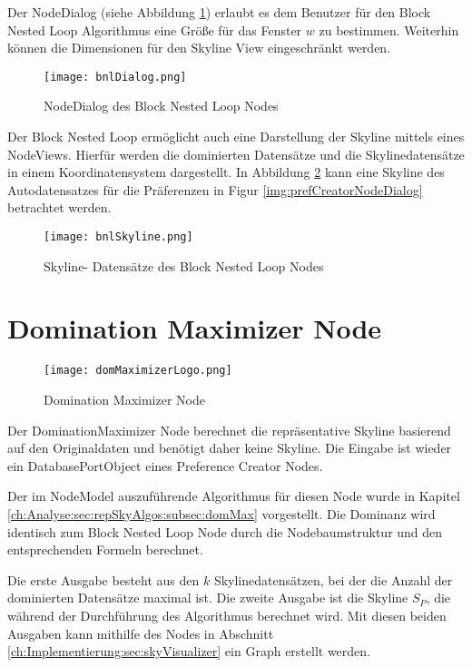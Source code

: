 Der NodeDialog (siehe Abbildung \ref{img:bnlNodeDialog}) erlaubt es dem Benutzer für den Block Nested Loop Algorithmus eine Größe für das Fenster $w$ zu bestimmen. Weiterhin können die Dimensionen für den Skyline View eingeschränkt werden.

\begin{figure}[H]
	\centering
	\texttt{[image: bnlDialog.png]}
	\caption{NodeDialog des Block Nested Loop Nodes}
	\label{img:bnlNodeDialog}
\end{figure}

Der Block Nested Loop ermöglicht auch eine Darstellung der Skyline mittels eines NodeViews. Hierfür werden die dominierten Datensätze und die Skylinedatensätze in einem Koordinatensystem dargestellt. In Abbildung \ref{img:bnlSkyline} kann eine Skyline des Autodatensatzes für die Präferenzen in Figur \ref{img:prefCreatorNodeDialog} betrachtet werden.

\begin{figure}[H]
	\centering
	\texttt{[image: bnlSkyline.png]}
	\caption{Skyline- Datensätze des Block Nested Loop Nodes}
	\label{img:bnlSkyline}
\end{figure}
\section{Domination Maximizer Node}
\label{ch:Implementierung:sec:dominationMaximizerNode}
\begin{figure}[H]
	\centering
	\texttt{[image: domMaximizerLogo.png]}
	\caption{Domination Maximizer Node}
	\label{img:domMaximierLogo}
\end{figure}

Der DominationMaximizer Node berechnet die repräsentative Skyline basierend auf den Originaldaten und benötigt daher keine Skyline. Die Eingabe ist wieder ein DatabasePortObject eines Preference Creator Nodes.

Der im NodeModel auszuführende Algorithmus für diesen Node wurde in Kapitel \ref{ch:Analyse:sec:repSkyAlgos:subsec:domMax} vorgestellt. Die Dominanz wird identisch zum Block Nested Loop Node durch die Nodebaumstruktur und den entsprechenden Formeln berechnet.

Die erste Ausgabe besteht aus den $k$ Skylinedatensätzen, bei der die Anzahl der dominierten Datensätze maximal ist. Die zweite Ausgabe ist die Skyline $S_P$, die während der Durchführung des Algorithmus berechnet wird. Mit diesen beiden Ausgaben kann mithilfe des Nodes in Abschnitt \ref{ch:Implementierung:sec:skyVisualizer} ein Graph erstellt werden. 

